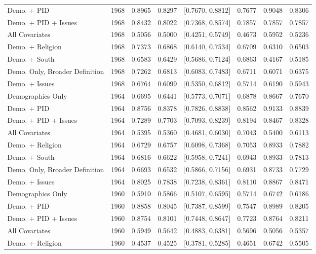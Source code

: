 \begin{longtable}{lrrrlrrr}
  Demo. + PID & 1968 & 0.8965 & 0.8297 & [0.7670, 0.8812] & 0.7677 & 0.9048 & 0.8306 \\ 
  Demo. + PID + Issues & 1968 & 0.8432 & 0.8022 & [0.7368, 0.8574] & 0.7857 & 0.7857 & 0.7857 \\ 
  All Covariates & 1968 & 0.5056 & 0.5000 & [0.4251, 0.5749] & 0.4673 & 0.5952 & 0.5236 \\ 
  Demo. + Religion & 1968 & 0.7373 & 0.6868 & [0.6140, 0.7534] & 0.6709 & 0.6310 & 0.6503 \\ 
  Demo. + South & 1968 & 0.6583 & 0.6429 & [0.5686, 0.7124] & 0.6863 & 0.4167 & 0.5185 \\ 
  Demo. Only, Broader Definition & 1968 & 0.7262 & 0.6813 & [0.6083, 0.7483] & 0.6711 & 0.6071 & 0.6375 \\ 
  Demo. + Issues & 1968 & 0.6764 & 0.6099 & [0.5350, 0.6812] & 0.5714 & 0.6190 & 0.5943 \\ 
  Demographics Only & 1964 & 0.6695 & 0.6441 & [0.5773, 0.7071] & 0.6878 & 0.8667 & 0.7670 \\ 
  Demo. + PID & 1964 & 0.8756 & 0.8378 & [0.7826, 0.8838] & 0.8562 & 0.9133 & 0.8839 \\ 
  Demo. + PID + Issues & 1964 & 0.7289 & 0.7703 & [0.7093, 0.8239] & 0.8194 & 0.8467 & 0.8328 \\ 
  All Covariates & 1964 & 0.5395 & 0.5360 & [0.4681, 0.6030] & 0.7043 & 0.5400 & 0.6113 \\ 
  Demo. + Religion & 1964 & 0.6729 & 0.6757 & [0.6098, 0.7368] & 0.7053 & 0.8933 & 0.7882 \\ 
  Demo. + South & 1964 & 0.6816 & 0.6622 & [0.5958, 0.7241] & 0.6943 & 0.8933 & 0.7813 \\ 
  Demo. Only, Broader Definition & 1964 & 0.6693 & 0.6532 & [0.5866, 0.7156] & 0.6931 & 0.8733 & 0.7729 \\ 
  Demo. + Issues & 1964 & 0.8025 & 0.7838 & [0.7238, 0.8361] & 0.8110 & 0.8867 & 0.8471 \\ 
  Demographics Only & 1960 & 0.5910 & 0.5866 & [0.5107, 0.6595] & 0.5714 & 0.6742 & 0.6186 \\ 
  Demo. + PID & 1960 & 0.8858 & 0.8045 & [0.7387, 0.8599] & 0.7547 & 0.8989 & 0.8205 \\ 
  Demo. + PID + Issues & 1960 & 0.8754 & 0.8101 & [0.7448, 0.8647] & 0.7723 & 0.8764 & 0.8211 \\ 
  All Covariates & 1960 & 0.5949 & 0.5642 & [0.4883, 0.6381] & 0.5696 & 0.5056 & 0.5357 \\ 
  Demo. + Religion & 1960 & 0.4537 & 0.4525 & [0.3781, 0.5285] & 0.4651 & 0.6742 & 0.5505 \\ 

\end{longtable}
